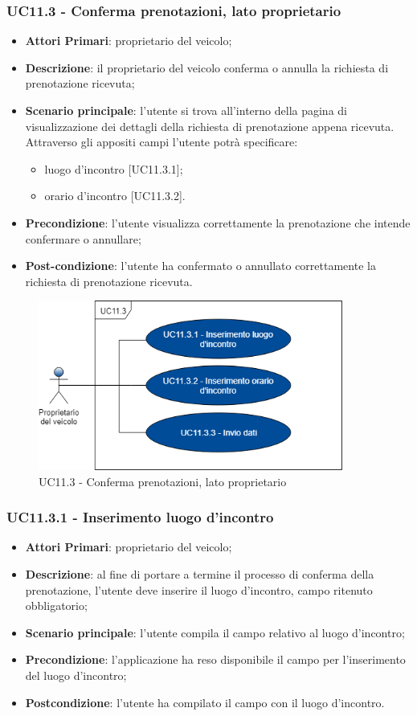 \subsubsection{UC11.3 - Conferma prenotazioni, lato proprietario}
\begin{itemize}
	\item \textbf{Attori Primari}: proprietario del veicolo;
	\item \textbf{Descrizione}: il proprietario del veicolo conferma o annulla la richiesta di prenotazione ricevuta;
	\item \textbf{Scenario principale}: l'utente si trova all'interno della pagina di visualizzazione dei dettagli della richiesta di prenotazione appena ricevuta. Attraverso gli appositi campi l'utente potrà specificare:
	\begin{itemize}
		\item luogo d'incontro [UC11.3.1];
		\item orario d'incontro [UC11.3.2].
	\end{itemize} 
	\item \textbf{Precondizione}: l'utente visualizza correttamente la prenotazione che intende confermare o annullare;
	\item \textbf{Post-condizione}: l'utente ha confermato o annullato correttamente la richiesta di prenotazione ricevuta.
\end{itemize}
\begin{figure}[h]
	\includegraphics[width=10cm]{res/images/UC11-3Conferma.png}
	\centering
	\caption{UC11.3 - Conferma prenotazioni, lato proprietario}
\end{figure}

\subsubsection{UC11.3.1 - Inserimento luogo d'incontro}
\begin{itemize}
	\item \textbf{Attori Primari}: proprietario del veicolo;
	\item \textbf{Descrizione}: al fine di portare a termine il processo di conferma della prenotazione, l'utente deve inserire il luogo d'incontro, campo ritenuto obbligatorio;
	\item \textbf{Scenario principale}: l'utente compila il campo relativo al luogo d'incontro;	
	\item \textbf{Precondizione}: l'applicazione ha reso disponibile il campo per l'inserimento del luogo d'incontro;
	\item \textbf{Postcondizione}: l'utente ha compilato il campo con il luogo d'incontro.	
\end{itemize}


